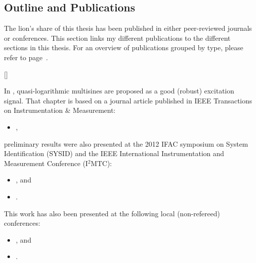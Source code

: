 \newpage
\subsection{Outline and Publications}
   The lion's share of this thesis has been published in either peer-reviewed  journals or conferences.
   This section links my different publications to the different sections in this thesis.
   For an overview of publications grouped by type, please refer to page~\pageref{publicationList}.

\begin{refsection}

\makeatletter
\DeclareCiteCommand{\fullcite}
  {%
    }
  {\usedriver
     {}
     {}}
  {\multicitedelim}
  {}
\DeclareCiteCommand{\footfullcite}[\mkbibfootnote]
  {%
    }
  {\usedriver
     {}
     {}}
  {\multicitedelim}
  {}
\makeatother


In , quasi-logarithmic multisines are proposed as a good (robust) excitation signal. 
That chapter is based on a journal article published in \gls{IEEE} Transactions on Instrumentation \& Measurement:
\begin{itemize}
  \item {}, 
\end{itemize}
preliminary results were also presented at the 2012 \gls{IFAC} symposium on System Identification (\textsc{SYSID}) and the \gls{IEEE} International Instrumentation and Measurement Conference (\textsc{I$^{\text{2}}$MTC}):
\begin{itemize}
  \item {}, and
  \item {}.
\end{itemize}
This work has also been presented at the following local (non-refereed) conferences:
\begin{itemize}
  \item {}, and
  \item {}.
\end{itemize}


\end{refsection}

